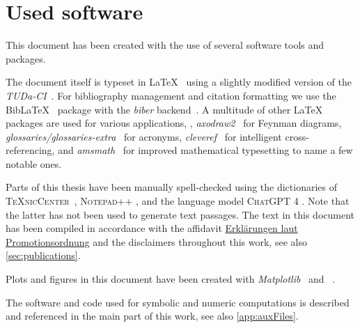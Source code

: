 \section{Used software}\label{app:software}
This document has been created with the use of several software tools and packages.

The document itself is typeset in \LaTeX{}~\cite{LaTeX,MiKTeX} using a slightly modified version of the \textit{TUDa-CI}~\cite{TUDa-CI,TUDa-CISteil}.
For bibliography management and citation formatting we use the Bib\LaTeX{}~\cite{BibLaTeX} package with the \textit{biber} backend~\cite{Biber}.
A multitude of other \LaTeX{} packages are used for various applications, \eg{}, \textit{axodraw2}~\cite{Collins:2016aya,axodraw2CTAN} for Feynman diagrams, 
\textit{glossaries/glossaries-extra}~\cite{glossaries,glossaries-extra} for acronyms, \textit{cleveref}~\cite{cleveref} for intelligent cross-referencing, and
 \textit{amsmath}~\cite{amsmath} for improved mathematical typesetting to name a few notable ones.

Parts of this thesis have been manually spell-checked using the dictionaries of \textsc{\TeX nic\allowbreak Center}~\cite{TeXnicCenter}, \textsc{Notepad++} \cite{npp}, and the language model \textsc{ChatGPT 4} \cite{ChatGPT4}.
Note that the latter has not been used to generate text passages. 
The text in this document has been compiled in accordance with the affidavit \dash{} \hyperref[chap:affidavit]{Erklärungen laut Promotionsordnung} \dash{} and the disclaimers throughout this work, see also \cref{sec:publications}.

Plots and figures in this document have been created with \textit{Matplotlib}~\cite{Hunter:2007} and \WAM{}~\cite{Mathematica:12.1,Mathematica:13.0}.

The software and code used for symbolic and numeric computations is described and referenced in the main part of this work, see also \cref{app:auxFiles}.